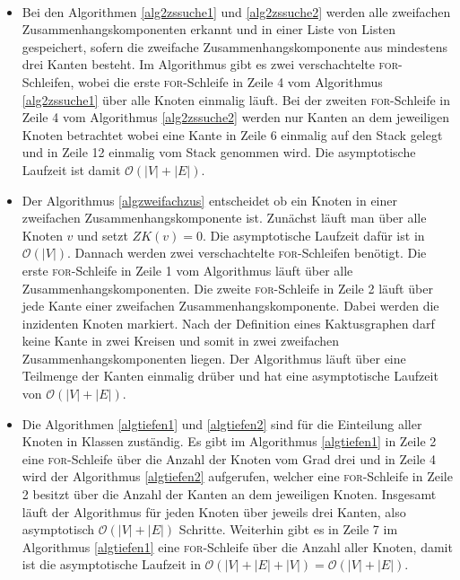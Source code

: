\begin{bem}~
\label{alg123}
\begin{itemize}
\item Bei den Algorithmen \ref{alg2zssuche1} und \ref{alg2zssuche2} werden alle zweifachen Zusammenhangskomponenten erkannt und in einer Liste von Listen gespeichert, sofern die zweifache Zusammenhangskomponente aus mindestens drei Kanten besteht. Im Algorithmus gibt es zwei verschachtelte \textsc{for}-Schleifen, wobei die erste \textsc{for}-Schleife in Zeile 4 vom Algorithmus \ref{alg2zssuche1} über alle Knoten einmalig läuft. Bei der zweiten \textsc{for}-Schleife in Zeile 4 vom Algorithmus \ref{alg2zssuche2} werden nur Kanten an dem jeweiligen Knoten betrachtet wobei eine Kante in Zeile 6 einmalig auf den Stack gelegt und in Zeile 12 einmalig vom Stack genommen wird. Die asymptotische Laufzeit ist damit $\mathcal{O}(|V|+|E|)$. 
\item Der Algorithmus \ref{algzweifachzus} entscheidet ob ein Knoten in einer zweifachen Zusammenhangskomponente ist. Zunächst läuft man über alle Knoten $v$ und setzt $ZK(v)=0$. Die asymptotische Laufzeit dafür ist in $\mathcal{O}(|V|)$. Dannach werden zwei verschachtelte \textsc{for}-Schleifen benötigt. Die erste \textsc{for}-Schleife in Zeile 1 vom Algorithmus läuft über alle Zusammenhangskomponenten. Die zweite \textsc{for}-Schleife in Zeile 2 läuft über jede Kante einer zweifachen Zusammenhangskomponente. Dabei werden die inzidenten Knoten markiert. Nach der Definition eines Kaktusgraphen darf keine Kante in zwei Kreisen und somit in zwei zweifachen Zusammenhangskomponenten liegen. Der Algorithmus läuft über eine Teilmenge der Kanten einmalig drüber und hat eine  
asymptotische Laufzeit von $\mathcal{O}(|V|+|E|)$.
\item Die Algorithmen \ref{algtiefen1} und \ref{algtiefen2} sind für die Einteilung aller Knoten in Klassen zuständig. Es gibt im Algorithmus \ref{algtiefen1} in Zeile 2 eine \textsc{for}-Schleife über die Anzahl der Knoten vom Grad drei und in Zeile 4 wird der Algorithmus \ref{algtiefen2} aufgerufen, welcher eine \textsc{for}-Schleife in Zeile 2 besitzt über die Anzahl der Kanten an dem jeweiligen Knoten. Insgesamt läuft der Algorithmus für jeden Knoten über jeweils drei Kanten, also asymptotisch $\mathcal{O}(|V|+|E|)$ Schritte. Weiterhin gibt es in Zeile 7 im Algorithmus \ref{algtiefen1} eine \textsc{for}-Schleife über die Anzahl aller Knoten, damit ist die asymptotische Laufzeit in $\mathcal{O}(|V|+|E|+|V|)=\mathcal{O}(|V|+|E|)$.

\end{itemize}
\end{bem}
